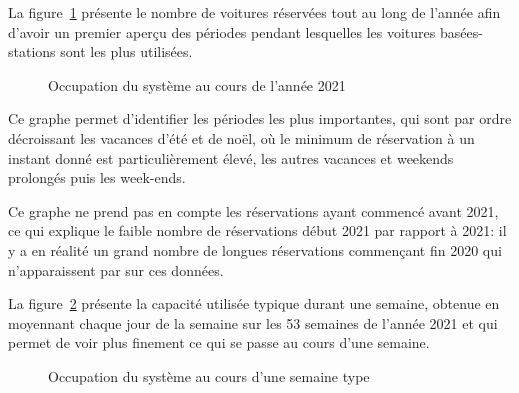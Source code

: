 \documentclass[12pt,a4paper]{article}
\newcommand{\1}[1]{\mathbbm{1}_{\{#1\}} }
\theoremstyle{definition}
\begin{document}
{La figure~\ref{Année_sbcs} présente le nombre de voitures réservées tout au long de l'année afin d'avoir un premier aperçu des périodes pendant lesquelles les voitures basées-stations sont les plus utilisées. 

\begin{figure}[!h]
\centering
{}
\caption{Occupation du système au cours de l'année 2021}
\label{Année_sbcs}
\end{figure}

Ce graphe permet d'identifier les périodes les plus importantes, qui sont par ordre décroissant les vacances d'été et de noël, où le minimum de réservation à un instant donné est particulièrement élevé, les autres vacances et weekends prolongés puis les week-ends.

Ce graphe ne prend pas en compte les réservations ayant commencé avant 2021, ce qui explique le faible nombre de réservations début 2021 par rapport à 2021: il y a en réalité un grand nombre de longues réservations commençant fin 2020 qui n'apparaissent par sur ces données.


La figure~\ref{semaine_type} présente la capacité utilisée typique durant une semaine, obtenue en moyennant chaque jour de la semaine sur les 53 semaines de l'année 2021 et qui permet de voir plus finement ce qui se passe au cours d'une semaine.


\begin{figure}[!h]
\centering
{}
\caption{Occupation du système au cours d'une semaine type}
\label{semaine_type}
\end{figure}

}
\end{document}
